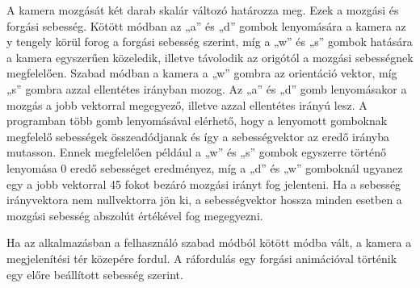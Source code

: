 \vspace{3mm}


\vspace{3mm}

A kamera mozgását két darab skalár változó határozza meg. 
Ezek a mozgási és forgási sebesség. 
Kötött módban az {\ttfamily „a”} és {\ttfamily „d”} gombok 
lenyomására a kamera az y tengely körül forog a forgási sebesség szerint,
míg a {\ttfamily „w”} és {\ttfamily „s”} gombok 
hatására a kamera egyszerűen közeledik, 
illetve távolodik az origótól a mozgási sebességnek megfelelően. 
Szabad módban a kamera a {\ttfamily „w”} 
gombra az orientáció vektor, 
míg {\ttfamily „s”} gombra azzal ellentétes irányban mozog. 
Az {\ttfamily „a”} és {\ttfamily „d”} gomb lenyomásakor 
a mozgás a jobb vektorral megegyező, 
illetve azzal ellentétes irányú lesz. 
A programban több gomb lenyomásával elérhető, 
hogy a lenyomott gomboknak megfelelő sebességek összeadódjanak és 
így a sebességvektor az eredő irányba mutasson. 
Ennek megfelelően például a {\ttfamily „w”} és {\ttfamily „s”} gombok 
egyszerre történő lenyomása 0 eredő sebességet eredményez, 
míg a {\ttfamily „d”} és {\ttfamily „w”} gomboknál 
ugyanez egy a jobb vektorral 45 fokot bezáró mozgási irányt fog jelenteni. 
Ha a sebesség irányvektora nem nullvektorra jön ki, 
a sebességvektor hossza minden esetben a mozgási sebesség abszolút értékével 
fog megegyezni.

\vspace{3mm}


\vspace{3mm}

Ha az alkalmazásban a felhasználó szabad módból kötött módba vált, 
a kamera a megjelenítési tér közepére fordul. 
A ráfordulás egy forgási animációval történik egy előre beállított sebesség szerint.


